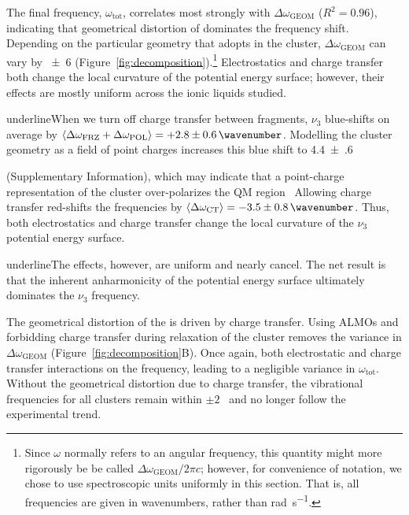 \documentclass[%
  class = book,%
  crop = false,%
  float = true,%
  multi = true,%
  preview = false,%
]{standalone}
\let\cite\autocite
\begin{document}
{The final frequency, \(\omega_\mathrm{tot}\), correlates most strongly with \(\Delta \omega_\mathrm{GEOM}\) (\(R^2 = 0.96\)), indicating that geometrical distortion of  dominates the frequency shift.  Depending on the particular geometry that  adopts in the cluster, \(\Delta \omega_\mathrm{GEOM}\) can vary by \SI{\pm 6}{\wavenumber} (Figure~\ref{fig:decomposition}).\footnote{Since \(\omega\) normally refers to an angular frequency, this quantity might more rigorously be be called \(\Delta \omega_\mathrm{GEOM} / 2 \pi c\); however, for convenience of notation, we chose to use spectroscopic units uniformly in this section. That is, all frequencies are given in wavenumbers, rather than \si{\radian\per\second}.} Electrostatics and charge transfer both change the local curvature of the potential energy surface; however, their effects are mostly uniform across the ionic liquids studied. \begin{akdjwarning}{underline}When we turn off charge transfer between fragments, \(\nu_3\) blue-shifts on average by \(\braket{\Delta \omega_\mathrm{FRZ} + \Delta \omega_\mathrm{POL}} = \SI{+2.8(6)}{\wavenumber}\). Modelling the cluster geometry as a field of point charges increases this blue shift to \SI{+4.4(6)}{\wavenumber}\end{akdjwarning} (Supplementary Information), which may indicate that a point-charge representation of the cluster over-polarizes the QM region~\cite{Bakowies1996,Hu2011} Allowing charge transfer red-shifts the frequencies by \(\braket{\Delta \omega_\mathrm{CT}} = \SI{-3.5(8)}{\wavenumber}\).  Thus, both electrostatics and charge transfer change the local curvature of the \(\nu_3\) potential energy surface. \begin{akdjwarning}{underline}The effects, however, are uniform and nearly cancel. The net result is that the inherent anharmonicity of the  potential energy surface ultimately dominates the \(\nu_3\) frequency.\end{akdjwarning} 

The geometrical distortion of the  is driven by charge transfer. Using ALMOs and forbidding charge transfer during relaxation of the cluster removes the variance in \(\Delta \omega_\mathrm{GEOM}\) (Figure~\ref{fig:decomposition}B). Once again, both electrostatic and charge transfer interactions   on the frequency, leading to a negligible variance in \(\omega_\mathrm{tot}\). Without the geometrical distortion due to charge transfer, the vibrational frequencies for all clusters remain within $\pm2$~\si{\wavenumber} and no longer follow the experimental trend.

}
\end{document}
